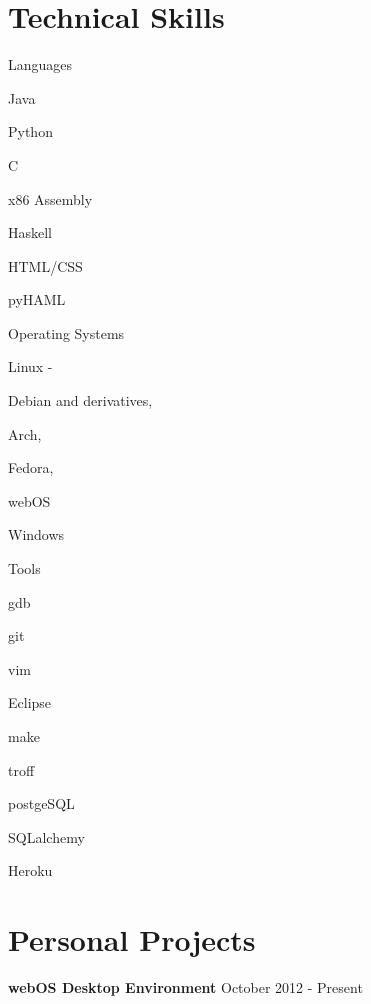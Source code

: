 \documentclass[letter,margin,line]{resume}
\begin{document}
\begin{resume}
\section{\mysidestyle Technical Skills}
	\begin{compactdesc}
		\item[Languages] \begin{inparaenum} { \small
			\item Java
			\item Python
			\item C
			\item x86 Assembly
			\item Haskell
			\item HTML/CSS
			\item pyHAML
		} \end{inparaenum}
		\item[Operating Systems] \begin{inparaenum} { \small
			\item Linux -
			\begin{inparablank}
				\item Debian and derivatives,
				\item Arch,
				\item Fedora,
				\item webOS
			\end{inparablank}
			\item Windows
		} \end{inparaenum}
		\item[Tools] \begin{inparaenum} { \small
			\item gdb
			\item git
			\item vim
			\item Eclipse
			\item make
			\item troff
			\item postgeSQL
			\item SQLalchemy
			\item Heroku
		} \end{inparaenum}
	\end{compactdesc}
\section{\mysidestyle Personal Projects}
	\begin{asparablank}
		\item {\bf webOS Desktop Environment} \hfill October 2012 - Present
		

\end{asparablank}
\end{resume}
\end{document}

